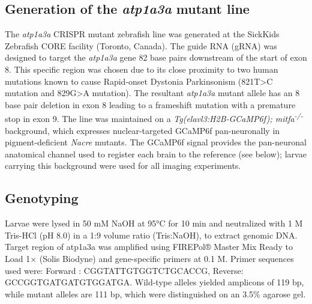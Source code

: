 \documentclass[9.5pt,lineno]{RandlettLab_elife}
\begin{document}
\subsection{Generation of the \emph{atp1a3a} mutant line}
The \emph{atp1a3a} CRISPR mutant zebrafish line was generated at the SickKids Zebrafish CORE facility (Toronto, Canada).
The guide RNA (gRNA) was designed to target the \emph{atp1a3a} gene 82 base pairs downstream of the start of exon 8.
This specific region was chosen due to its close proximity to two human mutations known to cause Rapid-onset Dystonia Parkinsonism (821T>C mutation and 829G>A mutation).
The resultant \emph{atp1a3a} mutant allele has an 8 base pair deletion in exon 8 leading to a frameshift mutation with a premature stop in exon 9.
The line was maintained on a \emph{Tg(elavl3:H2B-GCaMP6f); mitfa\textsuperscript{-/-}} background, which expresses nuclear-targeted GCaMP6f pan-neuronally in pigment-deficient \emph{Nacre} mutants. The GCaMP6f signal provides the pan-neuronal anatomical channel used to register each brain to the reference (see below); larvae carrying this background were used for all imaging experiments.


\subsection{Genotyping}
Larvae were lysed in 50 mM NaOH at 95°C for 10 min and neutralized with 1 M Tris-HCl (pH 8.0) in a 1:9 volume ratio (Tris:NaOH), to extract genomic DNA.
Target region of atp1a3a was amplified using FIREPol® Master Mix Ready to Load 1× (Solis Biodyne) and gene-specific primers at 0.1 \textmu M.
Primer sequences used were: Forward : CGGTATTGTGGTCTGCACCG, Reverse: GCCGGTGATGATGTGGATGA.
Wild-type alleles yielded amplicons of 119 bp, while mutant alleles are 111 bp, which were distinguished on an 3.5\% agarose gel.
\end{document}
